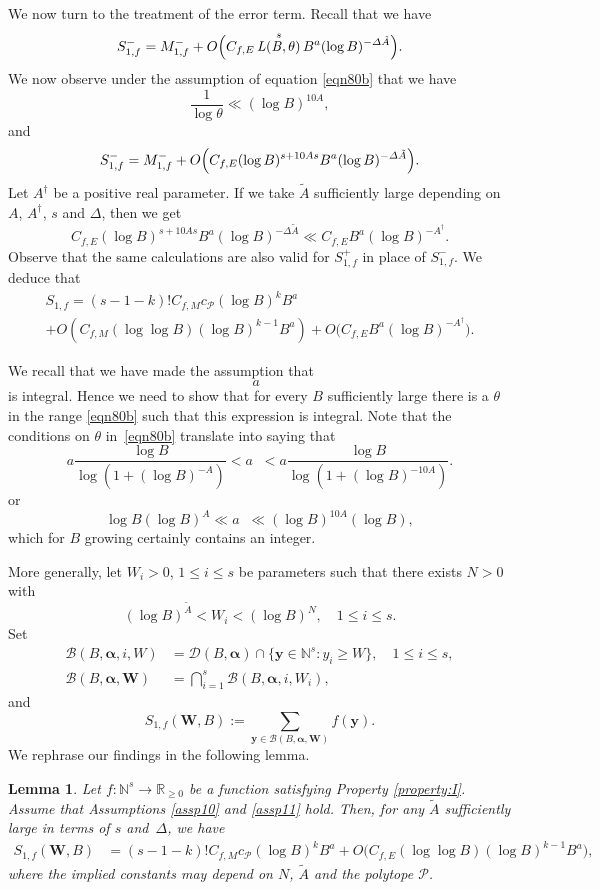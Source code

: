 \documentclass[JEP,XML,SOM,Unicode,published]{cedram}
\DeclareMathOperator{\LBt}{\mathit{L(B,\theta)}}
\newcommand{\cB}{\mathcal{B}}
\newcommand{\cD}{\mathcal{D}}
\newcommand{\cBalp}{\cD(B,\bfalp)}
\newcommand{\cBalpgen}[1]{\cB(B,\bfalp,#1)}
\newcommand{\cBalpW}{\cBalpgen{\bfW}}
\let\vardel\varDelta
\let\tet\theta
\newcommand{\bfy}{\boldsymbol{y}}
\newcommand{\bfalp}{\boldsymbol{\alpha}}
\newcommand{\bfW}{\boldsymbol{W}}
\newcommand{\calP}{\mathcal{P}}
\newcommand\NN{\mathbb{N}}
\newcommand{\N}{\mathbb{N}}
\newcommand\R{\mathbb{R}}
\newtheorem{lemma}[theorem]{Lemma}
\theoremstyle{definition}
\numberwithin{theorem}{section}
\begin{document}
We now turn to the treatment of the error term. Recall that we have
\[
S_{1,f}^-= M_{1,f}^- + O\Bigl(C_{f,E} \LBt^s B^{a} (\log B)^{-\vardel \tilde{A}}\Bigr).
\]
We now observe under the assumption of equation \eqref{eqn80b} that we have
\[
\frac{1}{\log \tet}\ll (\log B)^{10A},
\]
and
\[
S_{1,f}^-= M_{1,f}^- + O\Bigl(C_{f,E} (\log B)^{s+10As} B^{a} (\log B)^{-\vardel \tilde{A}}\Bigr).
\]
Let $A^\dagger$ be a positive real parameter. If we take $\tilde{A}$ sufficiently large depending on $A$, $A^\dagger$, $s$ and $\vardel$, then we get
\[
C_{f,E} (\log B)^{s+10As} B^{a} (\log B)^{-\vardel \tilde{A}} \ll C_{f,E} B^{a} (\log B)^{-A^\dagger}.
\]
Observe that the same calculations are also valid for $S_{1,f}^+$ in place of $S_{1,f}^-$. We deduce that
\begin{multline*}
S_{1,f}=(s-1-k)! C_{f,M}c_{\calP} (\log B)^kB^{a} \\
+O\left(C_{f,M}(\log \log B) (\log B)^{k-1} B^{a} \right) + O\bigl(C_{f,E} B^{a} (\log B)^{-A^\dagger}\bigr).
\end{multline*}

We recall that we have made the assumption that
\[
a \LBt
\]
is integral. Hence we need to show that for every $B$ sufficiently large there is a $\tet$ in the range \eqref{eqn80b} such that this expression is integral. Note that the conditions on $\tet$ in~\eqref{eqn80b} translate into saying that
\[
a \frac{\log B}{\log(1+(\log B)^{-A})}< a\LBt< a \frac{\log B}{\log (1+(\log B)^{-10A})}.
\]
or
\[
\log B (\log B)^A \ll a \LBt \ll (\log B)^{10A} (\log B),
\]
which for $B$ growing certainly contains an integer.\par

More generally, let $W_i>0$, $1\leq i\leq s$ be parameters such that there exists $N>0$ with
\[
(\log B)^{\tilde{A}}<W_i< (\log B)^N,\quad 1\leq i\leq s.
\]
Set
\begin{align*}
\cBalpgen{i,W}&=\cBalp\cap\{\bfy\in\NN^s: y_i \geq W\},\quad 1\leq i\leq s,\\
\cBalpW&=\bigcap_{i=1}^s\cBalpgen{i,W_i},
\end{align*}
and
\[
S_{1,f}(\bfW,B):= \sum_{\bfy\in\cBalpW}f(\bfy).
\]
We rephrase our findings in the following lemma.
\begin{lemma}\label{lem40}
Let $f: \N^s\rightarrow \R_{\geq 0}$ be a function satisfying Property \ref{property:I}. Assume that Assumptions \ref{assp10} and \ref{assp11} hold. Then, for any $\tilde A$ sufficiently large in terms of $s$ and~$\Delta$, we have
\begin{equation*}
\begin{split}
S_{1,f}(\bfW,B)&=(s-1-k)! C_{f,M}c_{\calP} (\log B)^kB^{a} +O\bigl(C_{f,E}(\log \log B) (\log B)^{k-1} B^{a} \bigr) ,
\end{split}
\end{equation*}
where the implied constants may depend on $N$, $\tilde{A}$ and the polytope $\calP$.
\end{lemma}
\end{document}
